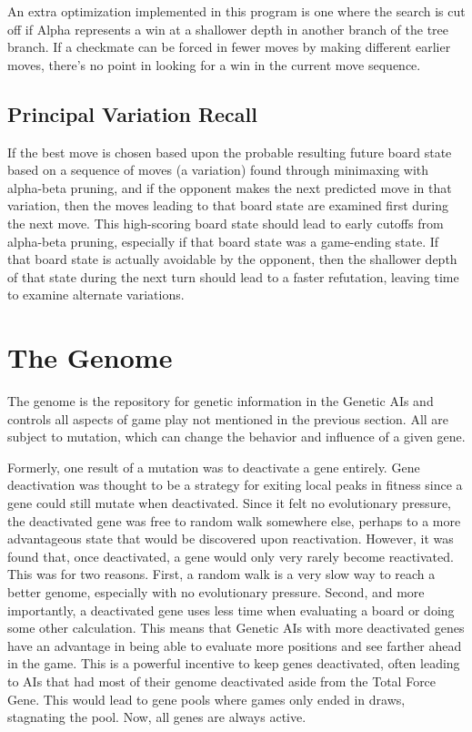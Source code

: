 \documentclass[letterpaper]{article}
\renewcommand{\_}{\allowbreak\textunderscore\allowbreak}
\begin{document}
An extra optimization implemented in this program is one where the search is cut off if Alpha represents a win at a shallower depth in another branch of the tree branch. If a checkmate can be forced in fewer moves by making different earlier moves, there's no point in looking for a win in the current move sequence.

\subsection{Principal Variation Recall}

If the best move is chosen based upon the probable resulting future board state based on a sequence of moves (a variation) found through minimaxing with alpha-beta pruning, and if the opponent makes the next predicted move in that variation, then the moves leading to that board state are examined first during the next move. This high-scoring board state should lead to early cutoffs from alpha-beta pruning, especially if that board state was a game-ending state. If that board state is actually avoidable by the opponent, then the shallower depth of that state during the next turn should lead to a faster refutation, leaving time to examine alternate variations.


\section{The Genome}
\label{gene-section}
The genome is the repository for genetic information in the Genetic AIs and controls all aspects of game play not mentioned in the previous section. All are subject to mutation, which can change the behavior and influence of a given gene.

Formerly, one result of a mutation was to deactivate a gene entirely. Gene deactivation was thought to be a strategy for exiting local peaks in fitness since a gene could still mutate when deactivated. Since it felt no evolutionary pressure, the deactivated gene was free to random walk somewhere else, perhaps to a more advantageous state that would be discovered upon reactivation. However, it was found that, once deactivated, a gene would only very rarely become reactivated. This was for two reasons. First, a random walk is a very slow way to reach a better genome, especially with no evolutionary pressure. Second, and more importantly, a deactivated gene uses less time when evaluating a board or doing some other calculation. This means that Genetic AIs with more deactivated genes have an advantage in being able to evaluate more positions and see farther ahead in the game. This is a powerful incentive to keep genes deactivated, often leading to AIs that had most of their genome deactivated aside from the Total Force Gene. This would lead to gene pools where games only ended in draws, stagnating the pool. Now, all genes are always active.
\end{document}
